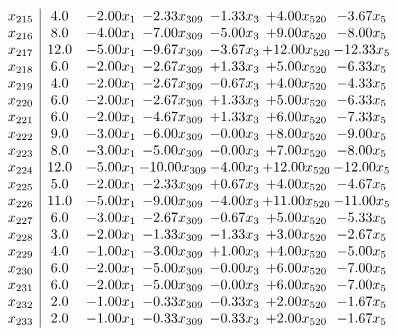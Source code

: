 \documentclass[8pt]{article}
\begin{document}
\[\begin{array}{c| c c@{\hskip 2pt} c@{\hskip 2pt} c@{\hskip 2pt} c@{\hskip 2pt} c@{\hskip 2pt} }
 x_{215}   &  4.0 & -2.00 x_{1} & -2.33 x_{309} & -1.33 x_{3} & +  4.00 x_{520} & -3.67 x_{5}\\
 x_{216}   &  8.0 & -4.00 x_{1} & -7.00 x_{309} & -5.00 x_{3} & +  9.00 x_{520} & -8.00 x_{5}\\
 x_{217}   &  12.0 & -5.00 x_{1} & -9.67 x_{309} & -3.67 x_{3} & + 12.00 x_{520} & -12.33 x_{5}\\
 x_{218}   &  6.0 & -2.00 x_{1} & -2.67 x_{309} & +  1.33 x_{3} & +  5.00 x_{520} & -6.33 x_{5}\\
 x_{219}   &  4.0 & -2.00 x_{1} & -2.67 x_{309} & -0.67 x_{3} & +  4.00 x_{520} & -4.33 x_{5}\\
 x_{220}   &  6.0 & -2.00 x_{1} & -2.67 x_{309} & +  1.33 x_{3} & +  5.00 x_{520} & -6.33 x_{5}\\
 x_{221}   &  6.0 & -2.00 x_{1} & -4.67 x_{309} & +  1.33 x_{3} & +  6.00 x_{520} & -7.33 x_{5}\\
 x_{222}   &  9.0 & -3.00 x_{1} & -6.00 x_{309} & -0.00 x_{3} & +  8.00 x_{520} & -9.00 x_{5}\\
 x_{223}   &  8.0 & -3.00 x_{1} & -5.00 x_{309} & -0.00 x_{3} & +  7.00 x_{520} & -8.00 x_{5}\\
 x_{224}   &  12.0 & -5.00 x_{1} & -10.00 x_{309} & -4.00 x_{3} & + 12.00 x_{520} & -12.00 x_{5}\\
 x_{225}   &  5.0 & -2.00 x_{1} & -2.33 x_{309} & +  0.67 x_{3} & +  4.00 x_{520} & -4.67 x_{5}\\
 x_{226}   &  11.0 & -5.00 x_{1} & -9.00 x_{309} & -4.00 x_{3} & + 11.00 x_{520} & -11.00 x_{5}\\
 x_{227}   &  6.0 & -3.00 x_{1} & -2.67 x_{309} & -0.67 x_{3} & +  5.00 x_{520} & -5.33 x_{5}\\
 x_{228}   &  3.0 & -2.00 x_{1} & -1.33 x_{309} & -1.33 x_{3} & +  3.00 x_{520} & -2.67 x_{5}\\
 x_{229}   &  4.0 & -1.00 x_{1} & -3.00 x_{309} & +  1.00 x_{3} & +  4.00 x_{520} & -5.00 x_{5}\\
 x_{230}   &  6.0 & -2.00 x_{1} & -5.00 x_{309} & -0.00 x_{3} & +  6.00 x_{520} & -7.00 x_{5}\\
 x_{231}   &  6.0 & -2.00 x_{1} & -5.00 x_{309} & -0.00 x_{3} & +  6.00 x_{520} & -7.00 x_{5}\\
 x_{232}   &  2.0 & -1.00 x_{1} & -0.33 x_{309} & -0.33 x_{3} & +  2.00 x_{520} & -1.67 x_{5}\\
 x_{233}   &  2.0 & -1.00 x_{1} & -0.33 x_{309} & -0.33 x_{3} & +  2.00 x_{520} & -1.67 x_{5}\\

\end{array}\]
\end{document}
